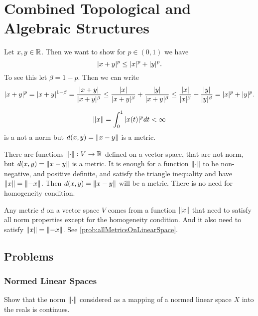 \chapter{Combined Topological and Algebraic Structures}


\begin{summary}
	Let $ x,y\in \mathbb{R} $. Then we want to show for $ p\in (0,1) $ we have
	\[ |x+y|^p \leq |x|^p + |y|^p. \]
	To see this let $ \beta = 1-p $. Then we can write
	\[ |x+y|^p = |x+y|^{1-\beta} = \frac{|x+y|}{|x+y|^\beta} \leq \frac{|x|}{|x+y|^\beta} + \frac{|y|}{|x+y|^\beta} \leq \frac{|x|}{|x|^\beta} + \frac{|y|}{|y|^\beta} = |x|^p + |y|^p. \]
\end{summary}

\begin{summary}
	\[ \norm{x} = \int_{0}^{1} |x(t)|^p dt < \infty \]
	is a not a norm but $ d(x,y) = \norm{x-y} $ is a metric.
\end{summary}

\begin{summary}
	There are functions $ \norm{\cdot}:V \to\mathbb{R} $ defined on a vector space, that are not norm, but $ d(x,y) = \norm{x-y} $ is a metric. It is enough for a function $ \norm{\cdot} $ to be non-negative, and positive definite, and satisfy the triangle inequality and have $ \norm{x}=\norm{-x} $. Then $ d(x,y) =\norm{x-y} $ will be a metric. There is no need for homogeneity condition.
\end{summary}

\begin{summary}
	Any metric $ d $ on a vector space $ V $ comes from a function $ \norm{x} $ that need to satisfy all norm properties except for the homogeneity condition. And it also need to satisfy $ \norm{x} = \norm{-x} $. See \autoref{prob:allMetricsOnLinearSpace}.
\end{summary}

\section{Problems}
\subsection{Normed Linear Spaces}
\begin{problem}
	Show that the norm $ \norm{\cdot} $ considered as a mapping of a normed linear space $ X $ into the reals is continues.
\end{problem}

